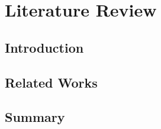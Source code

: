 \documentclass[12pt, a4paper]{article}
\begin{document}
\section{Literature Review}
\subsection{Introduction}
\subsection{Related Works}
\subsection{Summary}
\end{document}
